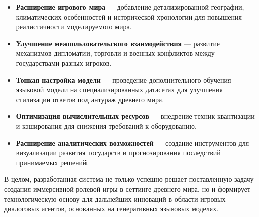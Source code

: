 \begin{itemize}
\item \textbf{Расширение игрового мира} — добавление детализированной географии, климатических особенностей и исторической хронологии для повышения реалистичности моделируемого мира.

\item \textbf{Улучшение межпользовательского взаимодействия} — развитие механизмов дипломатии, торговли и военных конфликтов между государствами разных игроков.

\item \textbf{Тонкая настройка модели} — проведение дополнительного обучения языковой модели на специализированных датасетах для улучшения стилизации ответов под антураж древнего мира.

\item \textbf{Оптимизация вычислительных ресурсов} — внедрение техник квантизации и кэширования для снижения требований к оборудованию.

\item \textbf{Расширение аналитических возможностей} — создание инструментов для визуализации развития государств и прогнозирования последствий принимаемых решений.
\end{itemize}

В целом, разработанная система не только успешно решает поставленную задачу создания иммерсивной ролевой игры в сеттинге древнего мира, но и формирует технологическую основу для дальнейших инноваций в области игровых диалоговых агентов, основанных на генеративных языковых моделях.
